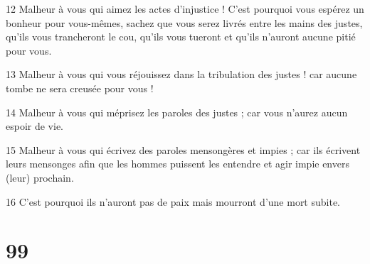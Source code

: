 \par 12 Malheur à vous qui aimez les actes d'injustice ! C'est pourquoi vous espérez un bonheur pour vous-mêmes, sachez que vous serez livrés entre les mains des justes, qu'ils vous trancheront le cou, qu'ils vous tueront et qu'ils n'auront aucune pitié pour vous.
\par 13 Malheur à vous qui vous réjouissez dans la tribulation des justes ! car aucune tombe ne sera creusée pour vous !
\par 14 Malheur à vous qui méprisez les paroles des justes ; car vous n’aurez aucun espoir de vie.
\par 15 Malheur à vous qui écrivez des paroles mensongères et impies ; car ils écrivent leurs mensonges afin que les hommes puissent les entendre et agir impie envers (leur) prochain.
\par 16 C'est pourquoi ils n'auront pas de paix mais mourront d'une mort subite.

\chapter{99}


